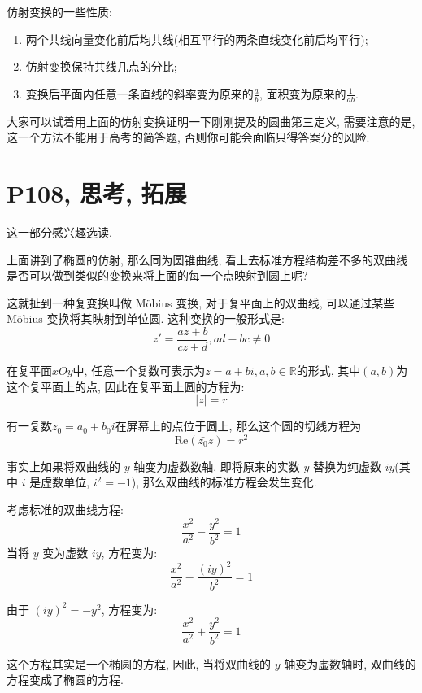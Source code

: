 \documentclass{book}
\begin{document}
        仿射变换的一些性质:
        \begin{enumerate}
            \item 两个共线向量变化前后均共线(相互平行的两条直线变化前后均平行);
            \item 仿射变换保持共线几点的分比;
            \item 变换后平面内任意一条直线的斜率变为原来的$\displaystyle \frac{a}{b}$, 面积变为原来的$\displaystyle \frac{1}{ab}$.
        \end{enumerate}

        大家可以试着用上面的仿射变换证明一下刚刚提及的圆曲第三定义, 需要注意的是, 这一个方法不能用于高考的简答题, 否则你可能会面临只得答案分的风险.

        \section{\textcolor[rgb]{0.11,0.65,0.52}{P108, 思考, 拓展}}

        这一部分感兴趣选读.

        上面讲到了椭圆的仿射, 那么同为圆锥曲线, 看上去标准方程结构差不多的双曲线是否可以做到类似的变换来将上面的每一个点映射到圆上呢?

        这就扯到一种复变换叫做 Möbius 变换, 对于复平面上的双曲线, 可以通过某些 Möbius 变换将其映射到单位圆. 这种变换的一般形式是:$$z'=\frac{az+b}{cz+d},ad-bc\neq 0$$
        
        在复平面$xOy$中, 任意一个复数可表示为$z=a+bi,a,b\in \mathbb{R}$的形式, 其中$(a,b)$为这个复平面上的点, 因此在复平面上圆的方程为:$$\left| z \right|=r$$

        有一复数$z_0=a_0+b_0i$在屏幕上的点位于圆上, 那么这个圆的切线方程为$$\mathrm{Re}\left( \bar{z_0}z \right)=r^2$$

        事实上如果将双曲线的 \( y \) 轴变为虚数数轴, 即将原来的实数 \( y \) 替换为纯虚数 \( iy \)(其中 \( i \) 是虚数单位, \( i^2 = -1 \)), 那么双曲线的标准方程会发生变化. 

        考虑标准的双曲线方程: 
        \[
        \frac{x^2}{a^2} - \frac{y^2}{b^2} = 1
        \]
        当将 \( y \) 变为虚数 \( iy \), 方程变为: 
        \[
        \frac{x^2}{a^2} - \frac{(iy)^2}{b^2} = 1
        \]
        
        由于 \( (iy)^2 = -y^2 \), 方程变为: 
        \[
        \frac{x^2}{a^2} + \frac{y^2}{b^2} = 1
        \]
        
        这个方程其实是一个椭圆的方程, 因此, 当将双曲线的 \( y \) 轴变为虚数轴时, 双曲线的方程变成了椭圆的方程.
\end{document}

